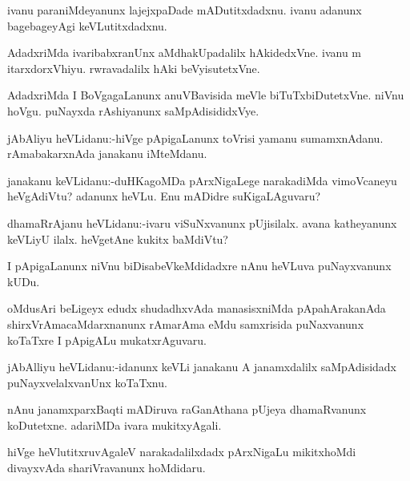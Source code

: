 \documentclass{article}
\begin{document}
\begin{mn}%
ivanu paraniMdeyanunx lajejxpaDade  mADutitxdadxnu. ivanu adanunx bagebageyAgi 
keVLutitxdadxnu.
\end{mn}

\begin{mn}%
AdadxriMda ivaribabxranUnx aMdhakUpadalilx hAkidedxVne. ivanu m itarxdorxVhiyu. rwravadalilx 
hAki beVyisutetxVne.
\end{mn}

\begin{mn}%
AdadxriMda I BoVgagaLanunx anuVBavisida meVle biTuTxbiDutetxVne. niVnu hoVgu. puNayxda 
rAshiyanunx saMpAdisididxVye.
\end{mn}

\begin{mn}%
jAbAliyu heVLidanu:-hiVge pApigaLanunx toVrisi yamanu sumamxnAdanu. rAmabakarxnAda 
janakanu iMteMdanu.
\end{mn}

\begin{mn}%
janakanu keVLidanu:-duHKagoMDa pArxNigaLege narakadiMda vimoVcaneyu heVgAdiVtu? adanunx 
heVLu. Enu mADidre suKigaLAguvaru?
\end{mn}

\begin{mn}%
dhamaRrAjanu heVLidanu:-ivaru viSuNxvanunx pUjisilalx. avana katheyanunx keVLiyU ilalx. 
heVgetAne kukitx baMdiVtu?
\end{mn}

\begin{mn}%
I pApigaLanunx niVnu biDisabeVkeMdidadxre nAnu heVLuva puNayxvanunx kUDu.
\end{mn}

\begin{mn}%
oMdusAri beLigeyx edudx shudadhxvAda manasisxniMda pApahArakanAda shirxVrAmacaMdarxnanunx 
rAmarAma eMdu samxrisida puNaxvanunx koTaTxre I pApigALu mukatxrAguvaru.
\end{mn}

\begin{mn}%
jAbAlliyu heVLidanu:-idanunx keVLi janakanu A janamxdalilx saMpAdisidadx 
puNayxvelalxvanUnx koTaTxnu.
\end{mn}

\begin{mn}%
nAnu janamxparxBaqti mADiruva raGanAthana pUjeya dhamaRvanunx koDutetxne. adariMDa ivara 
mukitxyAgali.
\end{mn}

\begin{mn}%
hiVge heVlutitxruvAgaleV narakadalilxdadx pArxNigaLu mikitxhoMdi divayxvAda shariVravanunx 
hoMdidaru.
\end{mn}
\end{document}
